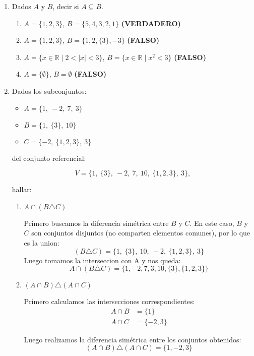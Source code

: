 \documentclass{article}
\begin{document}
\begin{enumerate}
    \item Dados $A$ y $B$, decir si $A \subseteq B$.
    \begin{enumerate}[label=\alph*)]
        \item $A=\{1,2,3\}$, $B=\{5,4,3,2,1\}$ \textbf{(VERDADERO)}
        \item $A=\{1,2,3\}$, $B=\{1,2,\{3\},-3\}$ \textbf{(FALSO)}
        \item $A=\{x \in \mathbb{R} \mid 2 < |x| < 3\}$, $B=\{x \in \mathbb{R} \mid x^2<3\}$ \textbf{(FALSO)}
        \item $A=\{\emptyset\}$, $B=\emptyset$ \textbf{(FALSO)}
    \end{enumerate}

    \item Dados los subconjuntos:
    
    \begin{itemize}
        \item $A = \{1,\ -2,\ 7,\ 3\}$
        \item $B = \{1,\ \{3\},\ 10\}$
        \item $C = \{-2,\ \{1, 2, 3\},\ 3\}$
    \end{itemize}
    
    del conjunto referencial:
    
    \[ V = \{1,\ \{3\},\ -2,\ 7,\ 10,\ \{1, 2, 3\},\ 3\}, \]
    
    hallar:
    \begin{enumerate}
        \item $A \cap (B \triangle C)$
        
        Primero buscamos la diferencia simétrica entre $B$ y $C$. En este caso, $B$ y $C$ son conjuntos disjuntos (no comparten elementos comunes), por lo que es la union:
        \[
        (B \triangle C) = \{1,\ \{3\},\ 10,\ -2,\ \{1, 2, 3\},\ 3\}
        \]
        Luego tomamos la interseccion con A y nos queda:
        \[
        A \cap (B \triangle C)=\{1,-2,7,3,10,\{3\},\{1,2,3\}\}
        \]
        
        \item $(A \cap B) \triangle (A \cap C)$
        
        Primero calculamos las intersecciones correspondientes:
        \begin{align*}
            A \cap B &= \{1\} \\
            A \cap C &= \{-2, 3\}
        \end{align*}
        
        Luego realizamos la diferencia simétrica entre los conjuntos obtenidos:
        \[
            (A \cap B) \triangle (A \cap C) = \{1, -2, 3\}
        \]
        

\end{enumerate}
\end{enumerate}
\end{document}
